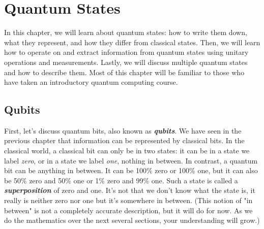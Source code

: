 \chapter[Quantum States]{Quantum States}
\label{sec:2_quantum_states}




In this chapter, we will learn about quantum states: how to write them down, what they represent, and how they differ from classical states.
Then, we will learn how to operate on and extract information from quantum states using unitary operations and measurements.
Lastly, we will discuss multiple quantum states and how to describe them. 
Most of this chapter will be familiar to those who have taken an introductory quantum computing course.

\section{Qubits}






First, let's discuss quantum bits, also known as \textbf{\emph{qubits}}. We have seen in the previous chapter that information can be represented by classical bits. In the classical world, a classical bit can only be in two states: it can be in a state we label \emph{zero}, or in a state we label \emph{one}, nothing in between. In contrast, a quantum bit can be anything in between. It can be 100\% zero or 100\% one, but it can also be 50\% zero and 50\% one or 1\% zero and 99\% one. Such a state is called a \textbf{\emph{superposition}} of zero and one. It's not that we don't know what the state is, it really is neither zero nor one but it's somewhere in between. (This notion of "in between" is not a completely accurate description, but it will do for now.  As we do the mathematics over the next several sections, your understanding will grow.)


